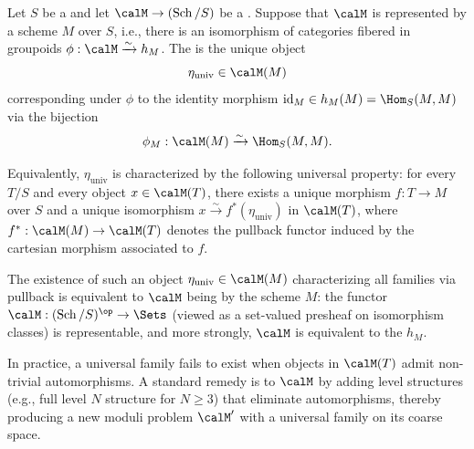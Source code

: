 \begin{definition} \label{definition:universal_family_for_a_moduli_problem_on_schemes}
    Let $S$ be a  and let $\calM \to (\operatorname{Sch}/S)$ be a . Suppose that $\calM$ is represented by a scheme $M$ over $S$, i.e., there is an isomorphism of categories fibered in groupoids $\phi: \calM \xrightarrow{\sim} h_M$. The  is the unique object
    $$\eta_{\mathrm{univ}} \in \calM(M)$$
    corresponding under $\phi$ to the identity morphism $\operatorname{id}_M \in h_M(M) = \Hom_S(M, M)$ via the bijection
    $$\phi_M: \calM(M) \xrightarrow{\sim} \Hom_S(M, M).$$

    Equivalently, $\eta_{\mathrm{univ}}$ is characterized by the following universal property: for every $T/S$ and every object $x \in \calM(T)$, there exists a unique morphism $f: T \to M$ over $S$ and a unique isomorphism $x \xrightarrow{\sim} f^*(\eta_{\mathrm{univ}})$ in $\calM(T)$, where $f^*: \calM(M) \to \calM(T)$ denotes the pullback functor induced by the cartesian morphism associated to $f$.

    The existence of such an object $\eta_{\mathrm{univ}} \in \calM(M)$ characterizing all families via pullback is equivalent to $\calM$ being  by the scheme $M$: the functor $\calM: (\operatorname{Sch}/S)^{\op} \to \Sets$ (viewed as a set-valued presheaf on isomorphism classes) is representable, and more strongly, $\calM$ is equivalent to the  $h_M$.

    In practice, a universal family fails to exist when objects in $\calM(T)$ admit non-trivial automorphisms. A standard remedy is to  $\calM$ by adding level structures (e.g., full level $N$ structure for $N \geq 3$) that eliminate automorphisms, thereby producing a new moduli problem $\calM'$ with a universal family on its coarse space.
\end{definition}
